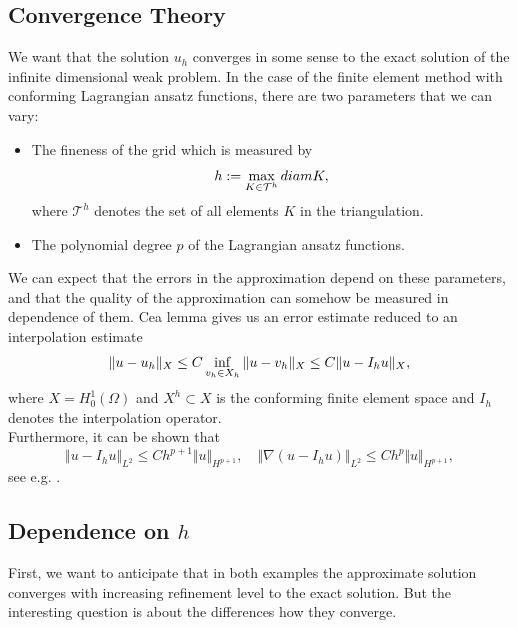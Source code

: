 \documentclass[a4paper, 11pt, twoside]{article}
\begin{document}
\subsection{Convergence Theory}
We want that the solution $u_h$ converges in some sense to the exact solution of the infinite dimensional weak problem. In the case of the finite element method with conforming Lagrangian ansatz functions, there are two parameters that we can vary:
\begin{itemize}
\item The fineness of the grid which is measured by
\begin{equation}
h := \max_{K \in \mathcal{T}^h} diam K, \notag
\end{equation}
where $\mathcal{T}^h$ denotes the set of all elements $K$ in the triangulation.
\item The polynomial degree $p$ of the Lagrangian ansatz functions.
\end{itemize}
We can expect that the errors in the approximation depend on these parameters, and that the quality of the approximation can somehow be measured in dependence of them. Cea lemma  gives us an error estimate reduced to an interpolation estimate
\begin{equation}
\Vert u-u_h\Vert_X \leq C \inf_{v_h \in X_h} \Vert u-v_h\Vert_X \leq C \Vert u-I_hu \Vert_X, \notag
\end{equation}
where $X=H_0^1(\Omega)$ and $X^h \subset X$ is the conforming finite element space and $I_h$ denotes the interpolation operator. \\
Furthermore, it can be shown that 
\begin{equation}
\Vert u-I_hu\Vert_{L^2} \leq C h^{p+1} \Vert u\Vert_{H^{p+1}}, \quad \Vert \nabla (u-I_hu)\Vert_{L^2} \leq C h^p \Vert u\Vert_{H^{p+1}}, 
\end{equation}
see e.g. \cite{braess}.

\subsection{Dependence on $h$}
First, we want to anticipate that in both examples the approximate solution converges with increasing refinement level to the exact solution. But the interesting question is about the differences how they converge.
\end{document}
